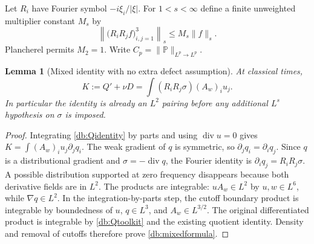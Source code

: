 \documentclass[11pt,a4paper]{article}
\newtheorem{lemma}[theorem]{Lemma}
\theoremstyle{definition}\newtheorem{hypothesis}[theorem]{Hypothesis}
\theoremstyle{remark}\newtheorem{remark}[theorem]{Remark}
\newcommand{\PP}{\mathbb P}
\newcommand{\norm}[1]{\lVert #1\rVert}
\newcommand{\diver}{\operatorname{div}}
\numberwithin{equation}{section}
\begin{document}
Let $R_i$ have Fourier symbol $-i\xi_i/|\xi|$. For $1<s<\infty$ define a
finite unweighted multiplier constant $M_s$ by
\begin{equation}\label{db:Ms}
 \left\|\bigl(R_iR_j f\bigr)_{i,j=1}^3\right\|_s\le M_s\norm f_s.
\end{equation}
Plancherel permits $M_2=1$. Write $C_p=\norm{\PP}_{L^p\to L^p}$.

\begin{lemma}[Mixed identity with no extra defect assumption]\label{db:mixed}
At classical times,
\begin{equation}\label{db:mixedformula}
 K:=Q'+\nu D=\int (R_iR_j\sigma)(A_w)_i u_j.
\end{equation}
In particular the identity is already an $L^2$ pairing before any additional
$L^s$ hypothesis on $\sigma$ is imposed.
\end{lemma}
\begin{proof}
Integrating \eqref{db:Qidentity} by parts and using $\diver u=0$ gives
$K=\int (A_w)_i u_j\partial_jq_i$. The weak gradient of $q$ is symmetric,
so $\partial_jq_i=\partial_iq_j$. Since $q$ is a distributional gradient
and $\sigma=-\diver q$, the Fourier identity is
$\partial_iq_j=R_iR_j\sigma$. A possible distribution supported at zero
frequency disappears because both derivative fields are in $L^2$.
The products are integrable: $uA_w\in L^2$ by $u,w\in L^6$, while
$\nabla q\in L^2$. In the integration-by-parts step, the cutoff boundary
product is integrable by boundedness of $u$, $q\in L^3$, and
$A_w\in L^{3/2}$. The original differentiated product is integrable by
\eqref{db:Qtoolkit} and the existing quotient identity. Density and removal
of cutoffs therefore prove \eqref{db:mixedformula}.
\end{proof}
\end{document}
